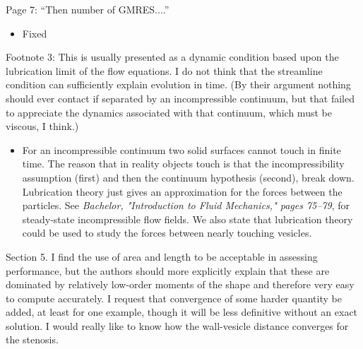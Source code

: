 \documentclass[11pt]{article}
\newcommand{\comment}[1]{{\color{blue} #1}}
\begin{document}
\comment{Page 7: ``Then number of GMRES....''}
\begin{itemize}
  \item Fixed
\end{itemize}


\comment{Footnote 3: This is usually presented as a dynamic condition
based upon the lubrication limit of the flow equations. I do not think
that the streamline condition can sufficiently explain evolution in
time.  (By their argument nothing should ever contact if separated by an
incompressible continuum, but that failed to appreciate the dynamics
associated with that continuum, which must be viscous, I think.)}
\begin{itemize}
  \item For an incompressible continuum two solid surfaces cannot touch
  in finite time.  The reason that in reality objects touch is that the
  incompressibility assumption (first) and then the continuum hypothesis
  (second), break down.  Lubrication theory just gives an approximation
  for the forces between the particles.  See {\em Bachelor,
  "Introduction to Fluid Mechanics," pages 75--79}, for steady-state
  incompressible flow fields.  We also state that lubrication theory
  could be used to study the forces between nearly touching vesicles. 
\end{itemize}


\comment{Section 5. I find the use of area and length to be acceptable
in assessing performance, but the authors should more explicitly
explain that these are dominated by relatively low-order moments of the
shape and therefore very easy to compute accurately. I request that
convergence of some harder quantity be added, at least for one example,
though it will be less definitive without an exact solution. I would
really like to know how the wall-vesicle distance converges for the
stenosis.}
\end{document}
